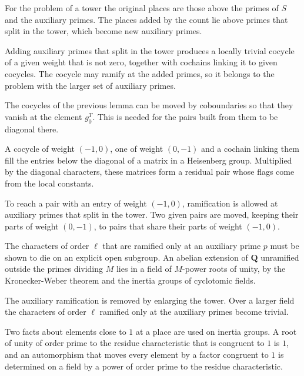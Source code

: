 For the problem of a tower the original places are those above the primes of $S$ and the auxiliary primes. The places added by the count lie above primes that split in the tower, which become new auxiliary primes.

Adding auxiliary primes that split in the tower produces a locally trivial cocycle of a given weight that is not zero, together with cochains linking it to given cocycles. The cocycle may ramify at the added primes, so it belongs to the problem with the larger set of auxiliary primes.

The cocycles of the previous lemma can be moved by coboundaries so that they vanish at the element $g_0^T$. This is needed for the pairs built from them to be diagonal there.

A cocycle of weight $(-1,0)$, one of weight $(0,-1)$ and a cochain linking them fill the entries below the diagonal of a matrix in a Heisenberg group. Multiplied by the diagonal characters, these matrices form a residual pair whose flags come from the local constants.

To reach a pair with an entry of weight $(-1,0)$, ramification is allowed at auxiliary primes that split in the tower. Two given pairs are moved, keeping their parts of weight $(0,-1)$, to pairs that share their parts of weight $(-1,0)$.

The characters of order $\ell$ that are ramified only at an auxiliary prime $p$ must be shown to die on an explicit open subgroup. An abelian extension of $\mathbf Q$ unramified outside the primes dividing $M$ lies in a field of $M$-power roots of unity, by the Kronecker-Weber theorem and the inertia groups of cyclotomic fields.

The auxiliary ramification is removed by enlarging the tower. Over a larger field the characters of order $\ell$ ramified only at the auxiliary primes become trivial.

Two facts about elements close to $1$ at a place are used on inertia groups. A root of unity of order prime to the residue characteristic that is congruent to $1$ is $1$, and an automorphism that moves every element by a factor congruent to $1$ is determined on a field by a power of order prime to the residue characteristic.

